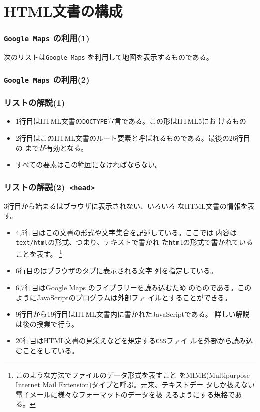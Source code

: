 \section{HTML文書の構成}
\begin{frame}[containsverbatim]
\frametitle{\texttt{Google Maps} の利用(1)}
次のリストは\texttt{Google Maps} を利用して地図を表示するものである。
\end{frame}
\begin{frame}[containsverbatim]
\frametitle{\texttt{Google Maps} の利用(2)}
\end{frame}
\begin{frame}[containsverbatim]
 \frametitle{リストの解説(1)}
\begin{itemize}
 \item 1行目はHTML文書の\texttt{DOCTYPE}宣言である。この形はHTML5にお
       けるもの
 \item 2行目はこのHTML文書のルート要素と呼ばれるものである。最後の26行目
       の までが有効となる。
 \item すべての要素はこの範囲になければならない。
\end{itemize}
\end{frame}
\begin{frame}[containsverbatim]
 \frametitle{リストの解説(2)--\texttt{<head>}}
3行目から始まるはブラウザに表示されない、いろいろ
       なHTML文書の情報を表す。
 \begin{itemize}
  \item 4,5行目はこの文書の形式や文字集合を記述している。ここでは
	内容は\texttt{text/html}の形式、つまり、テキストで書かれ
	た\texttt{html}の形式で書かれていることを表す。
	\footnote{このような方法でファイルのデータ形式を表すこと
	をMIME(Multipurpose
	Internet Mail Extension)タイプと呼ぶ。元来、テキストデー
	タしか扱えない電子メールに様々なフォーマットのデータを扱
	えるようにする規格である。}
  \item 6行目のはブラウザのタブに表示される文字
	列を指定している。
  \item 6,7行目はGoogle Maps のライブラリーを読み込むため
	のものである。このようにJavaScriptのプログラムは外部ファ
	イルとすることができる。
  \item 9行目から19行目はHTML文書内に書かれたJavaScriptである。
	詳しい解説は後の授業で行う。
  \item 20行目はHTML文書の見栄えなどを規定する\texttt{CSS}ファイ
	ルを外部から読み込むことをしている。
 \end{itemize}
\end{frame}
